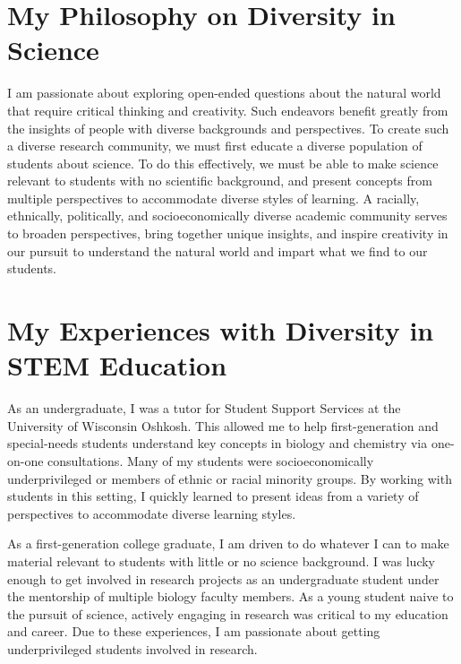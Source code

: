 \section*{My Philosophy on Diversity in Science}
I am passionate about exploring open-ended questions about the natural world
that require critical thinking and creativity.
Such endeavors benefit greatly from the insights of people with diverse
backgrounds and perspectives.
To create such a diverse research community, we must first educate a diverse
population of students about science.
To do this effectively, we must be able to make science relevant to students
with no scientific background, and present concepts from multiple perspectives
to accommodate diverse styles of learning.
A racially, ethnically, politically, and socioeconomically diverse academic
community serves to broaden perspectives, bring together unique insights, and
inspire creativity in our pursuit to understand the natural world and impart
what we find to our students.

\section*{My Experiences with Diversity in STEM Education}
As an undergraduate, I was a tutor for Student Support Services at the
University of Wisconsin Oshkosh.
This allowed me to help first-generation and special-needs students understand
key concepts in biology and chemistry via one-on-one consultations.
Many of my students were socioeconomically underprivileged or members of ethnic
or racial minority groups.
By working with students in this setting, I quickly learned to present ideas
from a variety of perspectives to accommodate diverse learning styles.

As a first-generation college graduate, I am driven to do whatever I can to
make material relevant to students with little or no science background.
I was lucky enough to get involved in research projects as an undergraduate
student under the mentorship of multiple biology faculty members.
As a young student naive to the pursuit of science, actively engaging in
research was critical to my education and career.
Due to these experiences, I am passionate about getting underprivileged
students involved in research.

